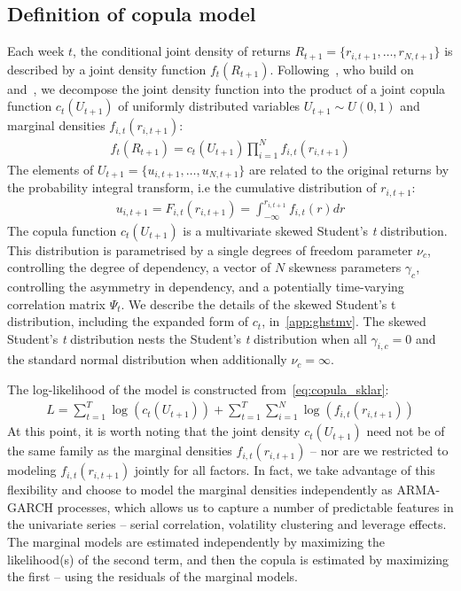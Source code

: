 
\subsection{Definition of copula model} %
\label{sub:definition_of_copula_model}

Each week $t$, the conditional joint density of returns $R_{t+1} = \{r_{i,t+1},\ldots,r_{N,t+1}\}$ is described by a joint density function $f_t(R_{t+1})$. Following~\textcite{ChristoffersenErrunzaJacobLanglois2012}, who build on~\textcite{Patton2006} and~\textcite{Sklar1959}, we decompose the joint density function into the product of a joint copula function $c_t(U_{t+1})$ of uniformly distributed variables $U_{t+1} \sim U(0, 1)$ and marginal densities $f_{i,t}(r_{i,t+1})$:
\begin{align}
  f_t(R_{t+1}) =
    c_t(U_{t+1}) \prod^N_{i=1} f_{i,t}(r_{i,t+1})
  \label{eq:copula_sklar}
\end{align}
The elements of $U_{t+1} = \{u_{i,t+1},\ldots,u_{N,t+1}\}$ are related to the original returns by the probability integral transform, i.e the cumulative distribution of $r_{i,t+1}$:
\begin{align}
  u_{i,t+1} = F_{i,t}(r_{i,t+1}) = \int_{-\infty}^{r_{i,t+1}} f_{i,t}(r)dr
\end{align}
The copula function $c_t(U_{t+1})$ is a multivariate skewed Student's \emph{t} distribution. This distribution is parametrised by a single degrees of freedom parameter $\nu_c$, controlling the degree of dependency, a vector of $N$ skewness parameters $\gamma_c$, controlling the asymmetry in dependency, and a potentially time-varying correlation matrix $\Psi_{t}$. We describe the details of the skewed Student's t distribution, including the expanded form of $c_t$, in~\autoref{app:ghstmv}. The skewed Student's \emph{t} distribution nests the Student's \emph{t} distribution when all $\gamma_{i,c} = 0$ and the standard normal distribution when additionally $\nu_c = \infty$.

The log-likelihood of the model is constructed from~\autoref{eq:copula_sklar}:
\begin{align}
  L =
    \sum_{t=1}^T \log(c_t(U_{t+1})) +
    \sum_{t=1}^T \sum_{i=1}^N \log(f_{i,t}(r_{i,t+1}))
\end{align}
At this point, it is worth noting that the joint density $c_t(U_{t+1})$ need not be of the same family as the marginal densities $f_{i,t}(r_{i,t+1})$ -- nor are we restricted to modeling $f_{i,t}(r_{i,t+1})$ jointly for all factors. In fact, we take advantage of this flexibility and choose to model the marginal densities independently as ARMA-GARCH processes, which allows us to capture a number of predictable features in the univariate series -- serial correlation, volatility clustering and leverage effects. The marginal models are estimated independently by maximizing the likelihood(s) of the second term, and then the copula is estimated by maximizing the first -- using the residuals of the marginal models.

